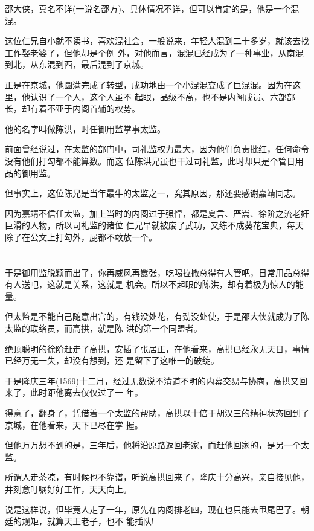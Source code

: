 \documentclass[11pt,a4paper,onecolumn]{article}
\begin{document}
邵大侠，真名不详(一说名邵方)、具体情况不详，但可以肯定的是，他是一个混混。

这位仁兄自小就不读书，喜欢混社会，一般说来，年轻人混到二十多岁，就该去找工作娶老婆了，但他却是个例
外，对他而言，混混已经成为了一种事业，从南混到北，从东混到西，最后混到了京城。

正是在京城，他圆满完成了转型，成功地由一个小混混变成了巨混混。因为在这里，他认识了一个人，这个人虽不
起眼，品级不高，也不是内阁成员、六部部长，却有着不亚于内阁首辅的权势。

他的名字叫做陈洪，时任御用监掌事太监。

前面曾经说过，在太监的部门中，司礼监权力最大，因为他们负责批红，任何命令没有他们打勾都不能算数。而这
位陈洪兄虽也干过司礼监，此时却只是个管日用品的御用监。

但事实上，这位陈兄是当年最牛的太监之一，究其原因，那还要感谢嘉靖同志。

因为嘉靖不信任太监，加上当时的内阁过于强悍，都是夏言、严嵩、徐阶之流老奸巨滑的人物，所以司礼监的诸位
仁兄早就被废了武功，又练不成葵花宝典，每天除了在公文上打勾外，屁都不敢放一个。

\section[\thesection]{}

于是御用监脱颖而出了，你再威风再嚣张，吃喝拉撒总得有人管吧，日常用品总得有人送吧，这就是关系，这就是
机会。所以不起眼的陈洪，却有着极为惊人的能量。

但太监是不能自己随意出宫的，有钱没处花，有劲没处使，于是邵大侠就成为了陈太监的联络员，而高拱，就是陈
洪的第一个同盟者。

绝顶聪明的徐阶赶走了高拱，安插了张居正，在他看来，高拱已经永无天日，事情已经万无一失，却没有想到，还
是留下了这唯一的破绽。

于是隆庆三年(1569)十二月，经过无数说不清道不明的内幕交易与协商，高拱又回来了，此时距他离去仅仅过了一
年。

得意了，翻身了，凭借着一个太监的帮助，高拱以十倍于胡汉三的精神状态回到了京城，在他看来，天下已尽在掌
握。

但他万万想不到的是，三年后，他将沿原路返回老家，而赶他回家的，是另一个太监。

所谓人走茶凉，有时候也不靠谱，听说高拱回来了，隆庆十分高兴，亲自接见他，并刻意叮嘱好好工作，天天向上。

说是这样说，但毕竟人走了一年，原先在内阁排老四，现在也只能去甩尾巴了。朝廷的规矩，就算天王老子，也不
能插队!
\end{document}
